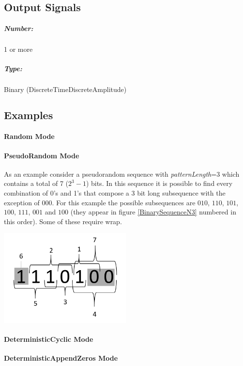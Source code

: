 \documentclass[a4paper]{article}
\begin{document}
\subsection*{Output Signals}

\subparagraph*{Number:} 1 or more

\subparagraph*{Type:} Binary (DiscreteTimeDiscreteAmplitude)

\subsection*{Examples} 

\paragraph*{Random Mode}

\paragraph*{PseudoRandom Mode}
As an example consider a pseudorandom sequence with \textit{patternLength}=3 which contains a total of 7 ($2^3-1$) bits. In this sequence it is possible to find every combination of 0's and 1's that compose a 3 bit long subsequence with the exception of $000$. For this example the possible subsequences are $010$, $110$, $101$, $100$, $111$, $001$ and $100$ (they appear in figure \ref{BinarySequenceN3} numbered in this order). Some of these require wrap. 

\begin{center}
\includegraphics[width=0.5\textwidth]{BinarySequenceN3}
\label{BinarySequenceN3}
\end{center}

\paragraph*{DeterministicCyclic Mode}

\paragraph*{DeterministicAppendZeros Mode}
\end{document}

